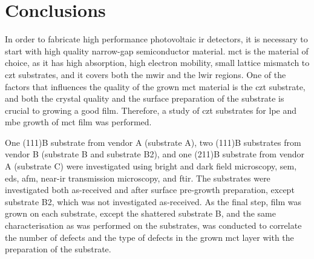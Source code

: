 \chapter{Conclusions}\label{ch:conclusion}

In order to fabricate high performance photovoltaic \ac{ir} detectors, it is necessary to start with high quality narrow-gap semiconductor material. \Ac{mct} is the material of choice, as it has high absorption, high electron mobility, small lattice mismatch to \ac{czt} substrates, and it covers both the \ac{mwir} and the \ac{lwir} regions. One of the factors that influences the quality of the grown \ac{mct} material is the \ac{czt} substrate, and both the crystal quality and the surface preparation of the substrate is crucial to growing a good film. Therefore, a study of \ac{czt} substrates for \ac{lpe} and \ac{mbe} growth of \ac{mct} film was performed.

One (111)B substrate from vendor A (substrate A), two (111)B substrates from vendor B (substrate B and substrate B2), and one (211)B substrate from vendor A (substrate C) were investigated using bright and dark field microscopy, \ac{sem}, \ac{eds}, \ac{afm}, near-\ac{ir} transmission microscopy, and \ac{ftir}. The substrates were investigated both as-received and after surface pre-growth preparation, except substrate B2, which was not investigated as-received. As the final step,  film was grown on each substrate, except the shattered substrate B, and the same characterisation as was performed on the substrates, was conducted to correlate the number of defects and the type of defects in the grown \ac{mct} layer with the preparation of the substrate.

